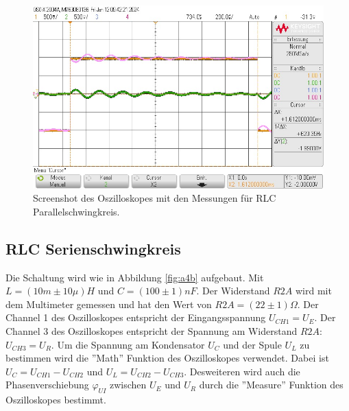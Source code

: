 \documentclass[12pt,a4paper,twoside]{article}
\begin{document}
\begin{figure}[H]
    \centering
    \includegraphics[width=0.6\linewidth]{nudes/Oszi aufgabe 3.jpg}
    \caption{Screenshot des Oszilloskopes mit den Messungen für RLC Parallelschwingkreis. }
    \label{fig:oszi aufgabe 3} 
\end{figure}


\subsection{RLC Serienschwingkreis}
Die Schaltung wird wie in Abbildung \ref{fig:a4b} aufgebaut. 
Mit $L = (10m \pm 10 \mu)H$ und $C = (100 \pm 1)nF$. Der Widerstand $R2A$ wird mit dem Multimeter gemessen und hat den Wert von $R2A = (22 \pm 1) \Omega$. 
Der Channel 1 des Oszilloskopes entspricht der Eingangsspannung $U_{CH1} = U_E$. 
Der Channel 3 des Oszilloskopes entspricht der Spannung am Widerstand $R2A$: $U_{CH3} = U_R$. 
Um die Spannung am Kondensator $U_C$ und der Spule $U_L$ zu bestimmen wird die ''Math'' Funktion des Oszilloskopes verwendet. Dabei ist $U_C = U_{CH1} - U_{CH2}$ und $U_L = U_{CH2} - U_{CH3}$. 
Desweiteren wird auch die Phasenverschiebung $\varphi_{UI}$ zwischen $U_E$ und $U_R$ durch die ''Measure'' Funktion des Oszilloskopes bestimmt. 
\end{document}
